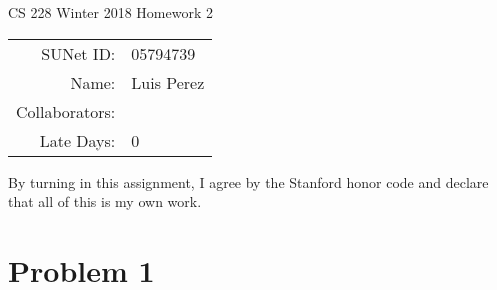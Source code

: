 \documentclass[12pt]{article}
\begin{document}
\begin{center}
{\Large CS 228 Winter 2018 Homework 2}

\begin{tabular}{rl}
SUNet ID: & 05794739 \\
Name: & Luis Perez \\
Collaborators: & \\
Late Days: & 0
\end{tabular}
\end{center}

By turning in this assignment, I agree by the Stanford honor code and declare
that all of this is my own work.

\section*{Problem 1}
\end{document}
